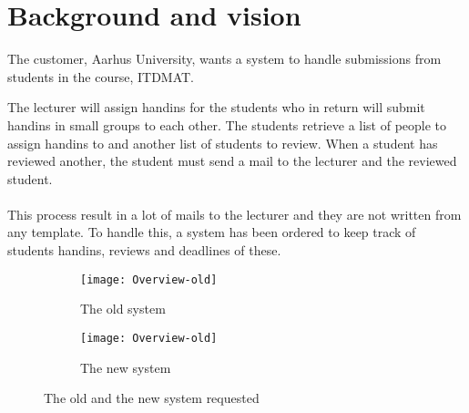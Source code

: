 \documentclass[Main]{subfiles}
\begin{document}
\section{Background and vision}
The customer, Aarhus University, wants a system to handle submissions from students in the course, ITDMAT.

The lecturer will assign handins for the students who in return will submit handins in small groups to each other.
The students retrieve a list of people to assign handins to and another list of students to review.
When a student has reviewed another, the student must send a mail to the lecturer and the reviewed student.
\\
\\
This process result in a lot of mails to the lecturer and they are not written from any template.
To handle this, a system has been ordered to keep track of students handins, reviews and deadlines of these.

\begin{figure}
	\centering
	\begin{subfigure}[b]{0.6\textwidth}
		\texttt{[image: Overview-old]}
		\caption{The old system}
		\label{fig:overview-old}
	\end{subfigure}%

	\begin{subfigure}[b]{0.6\textwidth}
		\texttt{[image: Overview-old]}
		\caption{The new system}
		\label{fig:overview-new}
	\end{subfigure}
	\caption{The old and the new system requested}\label{fig:overview}
\end{figure}
\end{document}
